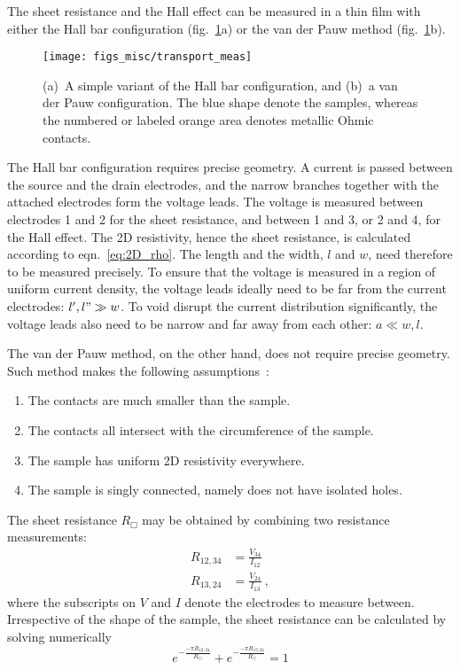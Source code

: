 The sheet resistance and the Hall effect can be measured in a thin film with either the Hall bar configuration (fig.~\ref{fig:transport_meas}a) or the van der Pauw method (fig.~\ref{fig:transport_meas}b).%
\begin{figure}[ht]%
	\centering%
    \texttt{[image: figs\_misc/transport\_meas]}%
    \caption[Hall bar and van der Pauw configuration]{\label{fig:transport_meas}(a)~A simple variant of the Hall bar configuration, and (b)~a van der Pauw configuration. The blue shape denote the samples, whereas the numbered or labeled orange area denotes metallic Ohmic contacts.}%
\end{figure}%

The Hall bar configuration requires precise geometry. A current is passed between the source and the drain electrodes, and the narrow branches together with the attached electrodes form the voltage leads. The voltage is measured between electrodes 1 and 2 for the sheet resistance, and between 1 and 3, or 2 and 4, for the Hall effect. The 2D resistivity, hence the sheet resistance, is calculated according to eqn.~\ref{eq:2D_rho}. The length and the width, $l$ and $w$, need therefore to be measured precisely. To ensure that the voltage is measured in a region of uniform current density, the voltage leads ideally need to be far from the current electrodes: $l', l" \gg w$. To void disrupt the current distribution significantly, the voltage leads also need to be narrow and far away from each other: $a \ll w, l$.

The van der Pauw method, on the other hand, does not require precise geometry. Such method makes the following assumptions~\cite{VdP1958}:%
\begin{enumerate}[label={\alph*)}]
    \item The contacts are much smaller than the sample.
    \item The contacts all intersect with the circumference of the sample.
    \item The sample has uniform 2D resistivity everywhere.
    \item The sample is singly connected, namely does not have isolated holes.
\end{enumerate}%
The sheet resistance $R_\Box$ may be obtained by combining two resistance measurements: %
\begin{align}
    R_{12,34} &= \frac{V_{34}}{I_{12}}\nonumber\\
    R_{13,24} &= \frac{V_{24}}{I_{13}}~,
\end{align}%
where the subscripts on $V$ and $I$ denote the electrodes to measure between. Irrespective of the shape of the sample, the sheet resistance can be calculated by solving numerically%
\begin{equation}\label{eq:vdp_full}
	e^{-\frac{-\pi{}R_{12,34}}{R_\Box}} + e^{-\frac{-\pi{}R_{13,24}}{R_\Box}} = 1
\end{equation}
